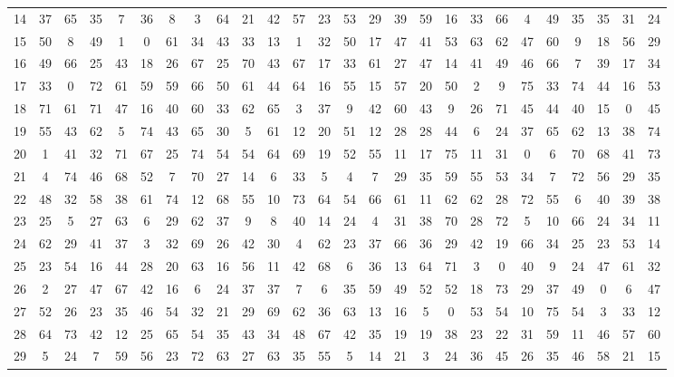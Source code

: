 \begin{table}
\begin{tabular}{c c c c c c c c c c c c c c c c c c c c c c c c c c }
14 & 37 & 65 & 35 & 7 & 36 & 8 & 3 & 64 & 21 & 42 & 57 & 23 & 53 & 29 & 39 & 59 & 16 & 33 & 66 & 4 & 49 & 35 & 35 & 31 & 24 \\
15 & 50 & 8 & 49 & 1 & 0 & 61 & 34 & 43 & 33 & 13 & 1 & 32 & 50 & 17 & 47 & 41 & 53 & 63 & 62 & 47 & 60 & 9 & 18 & 56 & 29 \\
16 & 49 & 66 & 25 & 43 & 18 & 26 & 67 & 25 & 70 & 43 & 67 & 17 & 33 & 61 & 27 & 47 & 14 & 41 & 49 & 46 & 66 & 7 & 39 & 17 & 34 \\
17 & 33 & 0 & 72 & 61 & 59 & 59 & 66 & 50 & 61 & 44 & 64 & 16 & 55 & 15 & 57 & 20 & 50 & 2 & 9 & 75 & 33 & 74 & 44 & 16 & 53 \\
18 & 71 & 61 & 71 & 47 & 16 & 40 & 60 & 33 & 62 & 65 & 3 & 37 & 9 & 42 & 60 & 43 & 9 & 26 & 71 & 45 & 44 & 40 & 15 & 0 & 45 \\
19 & 55 & 43 & 62 & 5 & 74 & 43 & 65 & 30 & 5 & 61 & 12 & 20 & 51 & 12 & 28 & 28 & 44 & 6 & 24 & 37 & 65 & 62 & 13 & 38 & 74 \\
20 & 1 & 41 & 32 & 71 & 67 & 25 & 74 & 54 & 54 & 64 & 69 & 19 & 52 & 55 & 11 & 17 & 75 & 11 & 31 & 0 & 6 & 70 & 68 & 41 & 73 \\
21 & 4 & 74 & 46 & 68 & 52 & 7 & 70 & 27 & 14 & 6 & 33 & 5 & 4 & 7 & 29 & 35 & 59 & 55 & 53 & 34 & 7 & 72 & 56 & 29 & 35 \\
22 & 48 & 32 & 58 & 38 & 61 & 74 & 12 & 68 & 55 & 10 & 73 & 64 & 54 & 66 & 61 & 11 & 62 & 62 & 28 & 72 & 55 & 6 & 40 & 39 & 38 \\
23 & 25 & 5 & 27 & 63 & 6 & 29 & 62 & 37 & 9 & 8 & 40 & 14 & 24 & 4 & 31 & 38 & 70 & 28 & 72 & 5 & 10 & 66 & 24 & 34 & 11 \\
24 & 62 & 29 & 41 & 37 & 3 & 32 & 69 & 26 & 42 & 30 & 4 & 62 & 23 & 37 & 66 & 36 & 29 & 42 & 19 & 66 & 34 & 25 & 23 & 53 & 14 \\
25 & 23 & 54 & 16 & 44 & 28 & 20 & 63 & 16 & 56 & 11 & 42 & 68 & 6 & 36 & 13 & 64 & 71 & 3 & 0 & 40 & 9 & 24 & 47 & 61 & 32 \\
26 & 2 & 27 & 47 & 67 & 42 & 16 & 6 & 24 & 37 & 37 & 7 & 6 & 35 & 59 & 49 & 52 & 52 & 18 & 73 & 29 & 37 & 49 & 0 & 6 & 47 \\
27 & 52 & 26 & 23 & 35 & 46 & 54 & 32 & 21 & 29 & 69 & 62 & 36 & 63 & 13 & 16 & 5 & 0 & 53 & 54 & 10 & 75 & 54 & 3 & 33 & 12 \\
28 & 64 & 73 & 42 & 12 & 25 & 65 & 54 & 35 & 43 & 34 & 48 & 67 & 42 & 35 & 19 & 19 & 38 & 23 & 22 & 31 & 59 & 11 & 46 & 57 & 60 \\
29 & 5 & 24 & 7 & 59 & 56 & 23 & 72 & 63 & 27 & 63 & 35 & 55 & 5 & 14 & 21 & 3 & 24 & 36 & 45 & 26 & 35 & 46 & 58 & 21 & 15 \\

\end{tabular}
\end{table}

